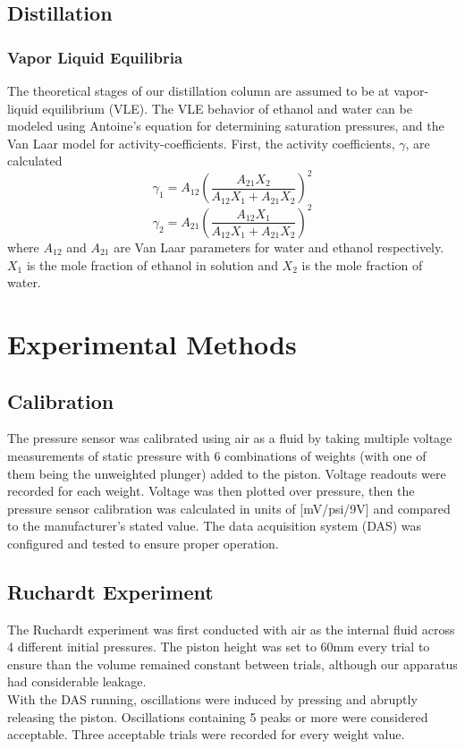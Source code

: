 \documentclass[lettersize,journal]{IEEEtran}
\begin{document}
	\subsection{Distillation}
	\subsubsection{Vapor Liquid Equilibria}
	The theoretical stages of our distillation column are assumed to be at vapor-liquid equilibrium (VLE). The VLE behavior of ethanol and water can be modeled using Antoine's equation for determining saturation pressures, and the Van Laar model for activity-coefficients.
	First, the activity coefficients, $\gamma$, are calculated
	\begin{equation}
		\label{deqn_ex5.5}
		\gamma_{1} = A_{12}(\frac{A_{21}X_{2}}{A_{12}X_{1}+A_{21}X_{2}})^{2}
	\end{equation}
	\begin{equation}
		\label{deqn_ex5.5}
		\gamma_{2} = A_{21}(\frac{A_{12}X_{1}}{A_{12}X_{1}+A_{21}X_{2}})^{2}
	\end{equation}
	where $A_{12}$ and $A_{21}$ are Van Laar parameters for water and ethanol respectively. $X_{1}$ is the mole fraction of ethanol in solution and $X_{2}$ is the mole fraction of water.
	
	
	
	
	\section{Experimental Methods}
	\subsection{Calibration}
	The pressure sensor was calibrated using air as a fluid by taking multiple voltage measurements of static pressure with 6 combinations of weights (with one of them being the unweighted plunger) added to the piston. Voltage readouts were recorded for each weight. Voltage was then plotted over pressure, then the pressure sensor calibration was calculated in units of [mV/psi/9V] and compared to the manufacturer's stated value.
	The data acquisition system (DAS) was configured and tested to ensure proper operation.
	\subsection{Ruchardt Experiment}
	The Ruchardt experiment was first conducted with air as the internal fluid across 4 different initial pressures. The piston height was set to 60mm every trial to ensure than the volume remained constant between trials, although our apparatus had considerable leakage. \\With the DAS running, oscillations were induced by pressing and abruptly releasing the piston.
	Oscillations containing 5 peaks or more were considered acceptable. Three acceptable trials were recorded for every weight value.
	
\end{document}
